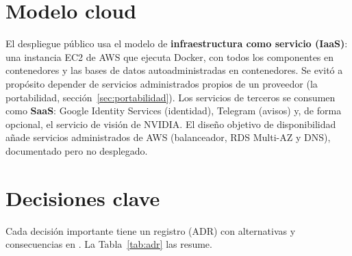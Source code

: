 \section{Modelo cloud}
El despliegue público usa el modelo de \textbf{infraestructura como servicio (IaaS)}: una instancia EC2 de AWS que ejecuta Docker, con todos
los componentes en contenedores y las bases de datos autoadministradas en contenedores. Se evitó a propósito depender de servicios
administrados propios de un proveedor (la portabilidad, sección~\ref{sec:portabilidad}). Los servicios de terceros se consumen como
\textbf{SaaS}: Google Identity Services (identidad), Telegram (avisos) y, de forma opcional, el servicio de visión de NVIDIA. El diseño
objetivo de disponibilidad añade servicios administrados de AWS (balanceador, RDS Multi-AZ y DNS), documentado pero no desplegado.

\section{Decisiones clave}
Cada decisión importante tiene un registro (ADR) con alternativas y consecuencias en . La Tabla~\ref{tab:adr} las resume.

